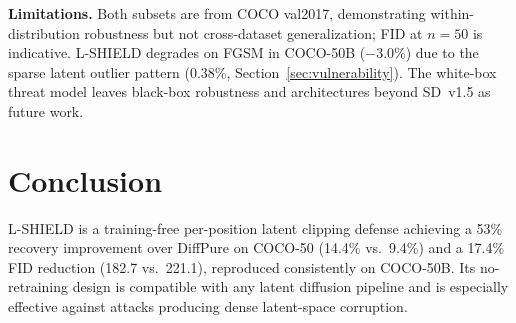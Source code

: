 \documentclass[conference]{IEEEtran}
\begin{document}
\enlargethispage{12pt}
\begin{table}[t]
\caption{Comparison with Prior Defenses on COCO-50 (averages across all four
attacks). Input Transform and Adversarial Training not evaluated on SD img2img.}
\label{tab:comparison}
\centering
\renewcommand{\arraystretch}{1.08}
\end{table}


\textbf{Limitations.}
Both subsets are from COCO val2017, demonstrating within-distribution robustness
but not cross-dataset generalization; FID at $n{=}50$ is indicative.
L-SHIELD degrades on FGSM in COCO-50B ($-3.0\%$) due to the sparse latent
outlier pattern (0.38\%, Section~\ref{sec:vulnerability}). The white-box threat model leaves
black-box robustness and architectures beyond SD~v1.5 as future work.

\section{Conclusion}
\enlargethispage{15pt}

L-SHIELD is a training-free per-position latent clipping defense achieving
a 53\% recovery improvement over DiffPure on COCO-50 (14.4\% vs.\ 9.4\%)
and a 17.4\% FID reduction (182.7 vs.\ 221.1), reproduced consistently on
COCO-50B. Its no-retraining design is compatible with any latent diffusion
pipeline and is especially effective against attacks producing dense latent-space corruption.
\end{document}
